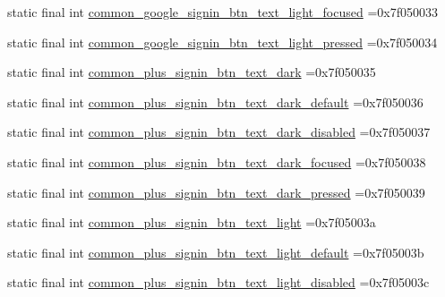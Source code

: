 \begin{DoxyCompactItemize}
\item 
static final int \mbox{\hyperlink{classbr_1_1unb_1_1cic_1_1mp_1_1marketmaster_1_1test_1_1R_1_1color_a12f7914a9b125868be5d6bf2acf4a76a}{common\+\_\+google\+\_\+signin\+\_\+btn\+\_\+text\+\_\+light\+\_\+focused}} =0x7f050033
\item 
static final int \mbox{\hyperlink{classbr_1_1unb_1_1cic_1_1mp_1_1marketmaster_1_1test_1_1R_1_1color_abba6f4bf3a0f27d515c03a1d11bf4360}{common\+\_\+google\+\_\+signin\+\_\+btn\+\_\+text\+\_\+light\+\_\+pressed}} =0x7f050034
\item 
static final int \mbox{\hyperlink{classbr_1_1unb_1_1cic_1_1mp_1_1marketmaster_1_1test_1_1R_1_1color_aae114a28041810374d388e89ec690a8a}{common\+\_\+plus\+\_\+signin\+\_\+btn\+\_\+text\+\_\+dark}} =0x7f050035
\item 
static final int \mbox{\hyperlink{classbr_1_1unb_1_1cic_1_1mp_1_1marketmaster_1_1test_1_1R_1_1color_acbd8ee4843d66746f28ea940b15b3b6c}{common\+\_\+plus\+\_\+signin\+\_\+btn\+\_\+text\+\_\+dark\+\_\+default}} =0x7f050036
\item 
static final int \mbox{\hyperlink{classbr_1_1unb_1_1cic_1_1mp_1_1marketmaster_1_1test_1_1R_1_1color_a30438dc0ffd916d4ae62942fe15fe972}{common\+\_\+plus\+\_\+signin\+\_\+btn\+\_\+text\+\_\+dark\+\_\+disabled}} =0x7f050037
\item 
static final int \mbox{\hyperlink{classbr_1_1unb_1_1cic_1_1mp_1_1marketmaster_1_1test_1_1R_1_1color_a3a5a5260896d9c070579f8faa9f69d78}{common\+\_\+plus\+\_\+signin\+\_\+btn\+\_\+text\+\_\+dark\+\_\+focused}} =0x7f050038
\item 
static final int \mbox{\hyperlink{classbr_1_1unb_1_1cic_1_1mp_1_1marketmaster_1_1test_1_1R_1_1color_a6c0203d0482070efa1b4833600006bbc}{common\+\_\+plus\+\_\+signin\+\_\+btn\+\_\+text\+\_\+dark\+\_\+pressed}} =0x7f050039
\item 
static final int \mbox{\hyperlink{classbr_1_1unb_1_1cic_1_1mp_1_1marketmaster_1_1test_1_1R_1_1color_a03438cf12e9119891db0122c94563ecc}{common\+\_\+plus\+\_\+signin\+\_\+btn\+\_\+text\+\_\+light}} =0x7f05003a
\item 
static final int \mbox{\hyperlink{classbr_1_1unb_1_1cic_1_1mp_1_1marketmaster_1_1test_1_1R_1_1color_a1b291c75aeca8a36b93055aa81fdabc4}{common\+\_\+plus\+\_\+signin\+\_\+btn\+\_\+text\+\_\+light\+\_\+default}} =0x7f05003b
\item 
static final int \mbox{\hyperlink{classbr_1_1unb_1_1cic_1_1mp_1_1marketmaster_1_1test_1_1R_1_1color_aa6a361c30376707360c1c9768b93422a}{common\+\_\+plus\+\_\+signin\+\_\+btn\+\_\+text\+\_\+light\+\_\+disabled}} =0x7f05003c

\end{DoxyCompactItemize}
